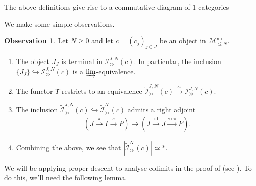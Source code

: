 \documentclass[12pt, reqno]{amsart}
\theoremstyle{plain}
\theoremstyle{definition}
\newtheorem{observation}[theorem]{Observation}
\begin{document}
The above definitions give rise to a commutative diagram of $1$-categories
\begin{center}
\end{center}

We make some simple observations.

\begin{observation}\label{observation about partition categories wrt c}
Let $N\geq 0$ and let $c=(c_j)_{j\in J}$ be an object in $\mathscr{M}^{\operatorname{nu}}_{\leq N}$.
\begin{enumerate}
\item The object $J_J$ is terminal in $\mathcal{I}_\gg^{J,N}(c)$. In particular, the inclusion $\{J_J\}\hookrightarrow \mathcal{I}_\gg^{J,N}(c)$ is a $\varinjlim$-equivalence.
\item The functor $\Upsilon$ restricts to an equivalence $\widetilde{\mathcal{I}}_\gg^{J,N}(c)\xrightarrow{\simeq} \mathcal{I}_\gg^{J,N}(c)$.
\item The inclusion $\widetilde{\mathcal{I}}_\gg^{J,N}(c) \hookrightarrow \widetilde{\mathcal{I}}^N_\gg(c)$ admits a right adjoint
\begin{align*}
(J\xrightarrow{\pi} I\xrightarrow{s} P)\mapsto (J\xrightarrow{\operatorname{id}} J\xrightarrow{s\circ \pi}P).
\end{align*}
\item Combining the above, we see that $|\widetilde{\mathcal{I}}^N_\gg(c)|\simeq \ast$.\qedhere
\end{enumerate}
\end{observation}

We will be applying proper descent to analyse colimits in the proof of  (see \cite[Theorem 2.29]{ClausenOrsnesJansen}). To do this, we'll need the following lemma.
\end{document}

